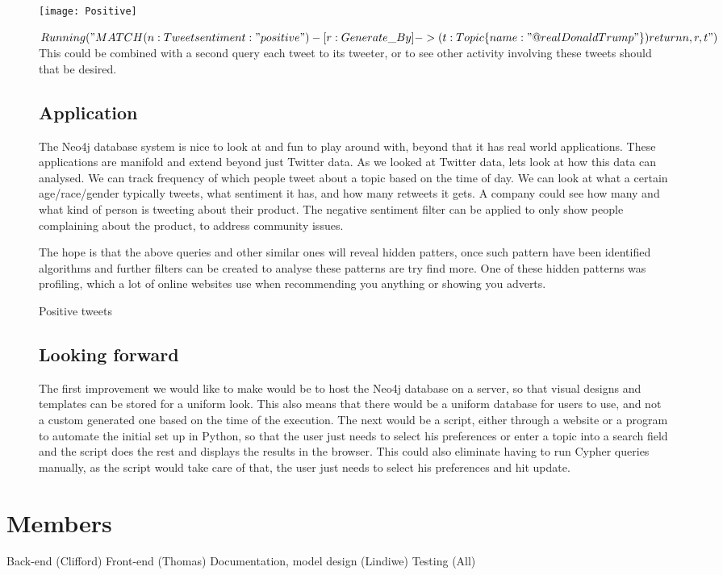 \documentclass[11pt]{article}
\begin{document}
\begin{figure}
\texttt{[image: Positive]}
\caption{Positive tweets} 
\label{fig: 6}

$Running ("MATCH (n:Tweet{sentiment:"positive"}) - [r:Generate\_By] -> (t:Topic\{name:"@realDonaldTrump"\}) return n,r,t")$
This could be combined with a second query each tweet to its tweeter, or to see other activity involving these tweets should that be desired.
\subsection{Application}
The Neo4j database system is nice to look at and fun to play around with, beyond that it has real world applications. These applications are manifold and extend beyond just Twitter data. As we looked at Twitter data, lets look at how this data can analysed. We can track frequency of which people tweet about a topic based on the time of day. We can look at what a certain age/race/gender typically tweets, what sentiment it has, and how many retweets it gets. A company could see how many and what kind of person is tweeting about their product. The negative sentiment filter can be applied to only show people complaining about the product, to address community issues.

The hope is that the above queries and other similar ones will reveal hidden patters, once such pattern have been identified algorithms and further filters can be created to analyse these patterns are try find more. One of these hidden patterns was profiling, which a lot of online websites use when recommending you anything or showing you adverts. 
\end{figure}

\begin{figure}
\subsection{Looking forward}
The first improvement we would like to make would be to host the Neo4j database on a server, so that visual designs and templates can be stored for a uniform look. This also means that there would be a uniform database for users to use, and not a custom generated one based on the time of the execution. The next would be a script, either through a website or a program to automate the initial set up in Python, so that the user just needs to select his preferences or enter a topic into a search field and the script does the rest and displays the results in the browser. This could also eliminate having to run Cypher queries manually, as the script would take care of that, the user just needs to select his preferences and hit update.
\end{figure}
\newpage
\section{Members}
Back-end (Clifford)\newline
Front-end (Thomas)\newline
Documentation, model design (Lindiwe)\newline
Testing (All)
\end{document}
